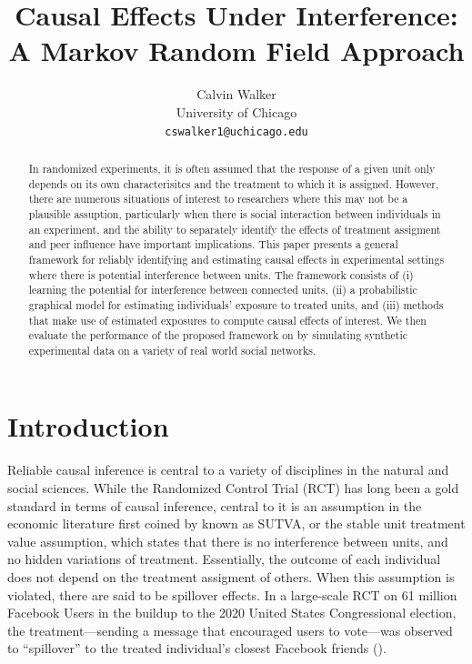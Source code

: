 \documentclass{article}
\title{Causal Effects Under Interference: A Markov Random Field Approach}
\author{%
  Calvin Walker \\
  University of Chicago\\
  \texttt{cswalker1@uchicago.edu} \\
}
\begin{document}
\maketitle


\begin{abstract}
    In randomized experiments, it is often assumed that the response of a given unit only depends on its own characterisitcs and the treatment to which it is assigned. However, there are numerous situations of interest to researchers 
    where this may not be a plausible assuption, particularly when there is social interaction between individuals in an experiment, and the ability to separately identify the effects of treatment assigment and peer influence have important implications. 
    This paper presents a general framework for reliably identifying and estimating causal effects in experimental settings where there is potential interference between units. The framework consists of 
    (i) learning the potential for interference between connected units, (ii) a probabilistic graphical model for estimating individuals' exposure to treated units, and (iii) methods that make use of estimated exposures to compute causal effects of interest. We then evaluate the performance of the proposed framework on by simulating synthetic experimental data on a variety of real world social networks.
\end{abstract}


\section{Introduction}

Reliable causal inference is central to a variety of disciplines in the natural and social sciences. While the Randomized Control Trial (RCT) has long been a gold standard in terms of 
causal inference, central to it is an assumption in the economic literature first coined by \cite{Rubin} known as SUTVA, or the stable unit treatment value assumption, which states that there is no
interference between units, and no hidden variations of treatment. Essentially, the outcome of each individual does not depend on the treatment assigment of others. When this assumption is violated, 
there are said to be spillover effects. In a large-scale RCT on 61 million Facebook Users in the buildup to the 2020 United States Congressional election, the treatment—sending a message that encouraged users to vote—was 
observed to ``spillover'' to the treated individual's closest Facebook friends (\cite{Bond}). 
\end{document}
